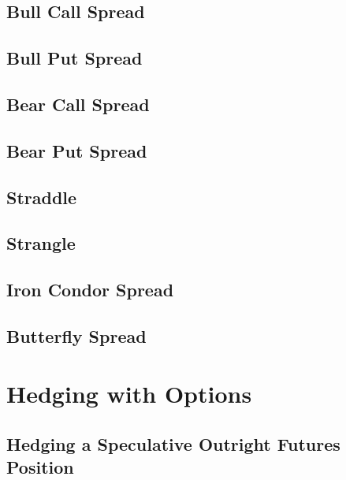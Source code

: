 \documentclass[
]{book}
\begin{document}
\hypertarget{bull-call-spread}{%
\section{Bull Call Spread}\label{bull-call-spread}}

\hypertarget{bull-put-spread}{%
\section{Bull Put Spread}\label{bull-put-spread}}

\hypertarget{bear-call-spread}{%
\section{Bear Call Spread}\label{bear-call-spread}}

\hypertarget{bear-put-spread}{%
\section{Bear Put Spread}\label{bear-put-spread}}

\hypertarget{straddle}{%
\section{Straddle}\label{straddle}}

\hypertarget{strangle}{%
\section{Strangle}\label{strangle}}

\hypertarget{iron-condor-spread}{%
\section{Iron Condor Spread}\label{iron-condor-spread}}

\hypertarget{butterfly-spread}{%
\section{Butterfly Spread}\label{butterfly-spread}}

\hypertarget{hedging-with-options}{%
\chapter{Hedging with Options}\label{hedging-with-options}}

\hypertarget{hedging-a-speculative-outright-futures-position}{%
\section{Hedging a Speculative Outright Futures Position}\label{hedging-a-speculative-outright-futures-position}}
\end{document}
